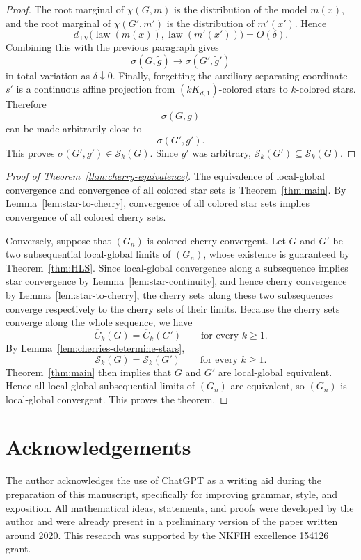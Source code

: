 \documentclass[11pt]{amsart}
\newcommand{\calS}{\mathcal S}
\newcommand{\TV}{\operatorname{TV}}
\theoremstyle{remark}
\begin{document}
\begin{proof}
The root marginal of $\chi(G,m)$ is the distribution of the model $m(x)$, and the root marginal of $\chi(G',m')$ is the distribution of $m'(x')$. Hence
\[
 d_{\TV}\bigl(\operatorname{law}(m(x)),\operatorname{law}(m'(x'))\bigr)=O(\delta).
\]
Combining this with the previous paragraph gives
\[
 \sigma(G,\widetilde g)\longrightarrow \sigma(G',\widetilde g')
\]
in total variation as $\delta\downarrow0$. Finally, forgetting the auxiliary separating coordinate $s'$ is a continuous affine projection from $(kK_{d,1})$-colored stars to $k$-colored stars. Therefore
\[
 \sigma(G,g)
\]
can be made arbitrarily close to
\[
 \sigma(G',g').
\]
This proves $\sigma(G',g')\in\calS_k(G)$. Since $g'$ was arbitrary, $\calS_k(G')\subseteq\calS_k(G)$.
\end{proof}

\begin{proof}[Proof of Theorem~\ref{thm:cherry-equivalence}]
The equivalence of local-global convergence and convergence of all colored star sets is Theorem~\ref{thm:main}. By Lemma~\ref{lem:star-to-cherry}, convergence of all colored star sets implies convergence of all colored cherry sets.

Conversely, suppose that $(G_n)$ is colored-cherry convergent. Let $G$ and $G'$ be two subsequential local-global limits of $(G_n)$, whose existence is guaranteed by Theorem~\ref{thm:HLS}. Since local-global convergence along a subsequence implies star convergence by Lemma~\ref{lem:star-continuity}, and hence cherry convergence by Lemma~\ref{lem:star-to-cherry}, the cherry sets along these two subsequences converge respectively to the cherry sets of their limits.  Because the cherry sets converge along the whole sequence, we have
\[
 \overline C_k(G)=\overline C_k(G')
 \qquad\text{for every }k\geq 1.
\]
By Lemma~\ref{lem:cherries-determine-stars},
\[
 \calS_k(G)=\calS_k(G')
 \qquad\text{for every }k\geq 1.
\]
Theorem~\ref{thm:main} then implies that $G$ and $G'$ are local-global equivalent. Hence all local-global subsequential limits of $(G_n)$ are equivalent, so $(G_n)$ is local-global convergent. This proves the theorem.
\end{proof}

\section*{Acknowledgements}
The author acknowledges the use of ChatGPT as a writing aid during the preparation of this manuscript, specifically for improving grammar, style, and exposition. All mathematical ideas, statements, and proofs were developed by the author and were already present in a preliminary version of the paper written around 2020. This research was supported by the NKFIH excellence 154126 grant.
\end{document}
